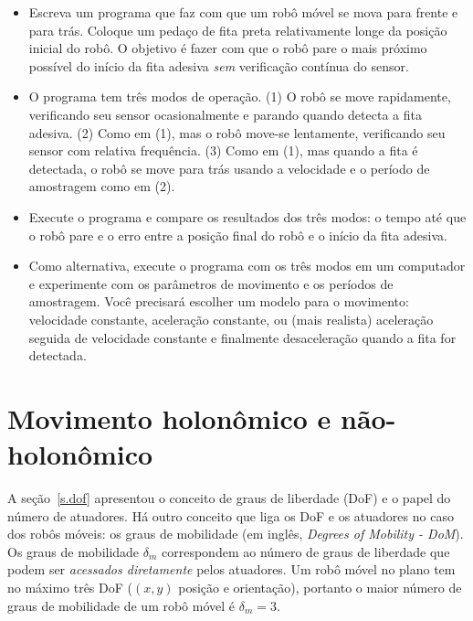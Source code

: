 \begin{framed}
\begin{itemize}
\item Escreva um programa que faz com que um robô móvel se mova para frente e para trás. Coloque um pedaço de fita preta relativamente longe da posição inicial do robô. O objetivo é fazer com que o robô pare o mais próximo possível do início da fita adesiva \emph{sem} verificação contínua do sensor. 
\item O programa tem três modos de operação. (1) O robô se move rapidamente, verificando seu sensor ocasionalmente e parando quando detecta a fita adesiva. (2) Como em (1), mas o robô move-se lentamente, verificando seu sensor com relativa frequência. (3) Como em (1), mas quando a fita é detectada, o robô se move para trás usando a velocidade e o período de amostragem como em (2).
\item Execute o programa e compare os resultados dos três modos: o tempo até que o robô pare e o erro entre a posição final do robô e o início da fita adesiva.
\item Como alternativa, execute o programa com os três modos em um computador e experimente com os parâmetros de movimento e os períodos de amostragem. Você precisará escolher um modelo para o movimento: velocidade constante, aceleração constante, ou (mais realista) aceleração seguida de velocidade constante e finalmente desaceleração quando a fita for detectada.
\end{itemize}
\end{framed}





















\section{Movimento holonômico e não-holonômico}\label{s.holonomic}

A seção~\ref{s.dof} apresentou o conceito de graus de liberdade (DoF) e o papel do número de atuadores. Há outro conceito que liga os DoF e os atuadores no caso dos robôs móveis: os graus de mobilidade (em inglês, \emph{Degrees of Mobility - DoM}). Os graus de mobilidade $\delta_m$ correspondem ao número de graus de liberdade que podem ser \emph{acessados diretamente} pelos atuadores. Um robô móvel no plano tem no máximo três DoF ($(x,y)$ posição e orientação), portanto o maior número de graus de mobilidade de um robô móvel é $\delta_m = 3$.

